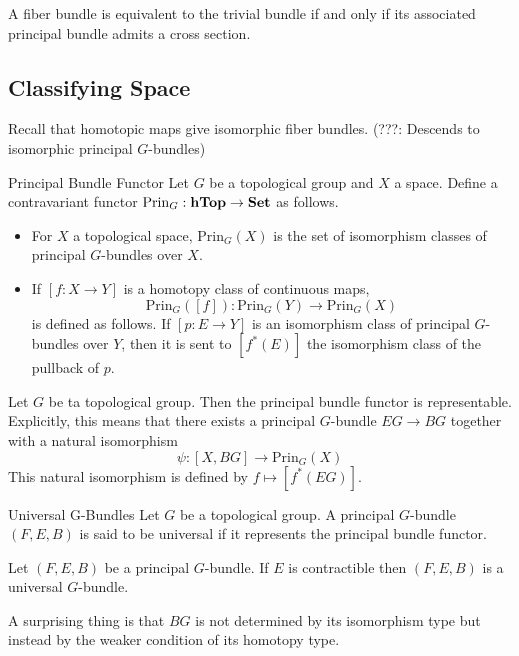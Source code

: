 \documentclass[a4paper]{article}
\begin{document}
\begin{crl}{}{} A fiber bundle is equivalent to the trivial bundle if and only if its associated principal bundle admits a cross section. 
\end{crl}

\subsection{Classifying Space}
Recall that homotopic maps give isomorphic fiber bundles. (???: Descends to isomorphic principal $G$-bundles)

\begin{defn}{Principal Bundle Functor}{} Let $G$ be a topological group and $X$ a space. Define a contravariant functor $\text{Prin}_G:\bold{hTop}\to\bold{Set}$ as follows. 
\begin{itemize}
\item For $X$ a topological space, $\text{Prin}_G(X)$ is the set of isomorphism classes of principal $G$-bundles over $X$. 
\item If $[f:X\to Y]$ is a homotopy class of continuous maps, $$\text{Prin}_G([f]):\text{Prin}_G(Y)\to\text{Prin}_G(X)$$ is defined as follows. If $[p:E\to Y]$ is an isomorphism class of principal $G$-bundles over $Y$, then it is sent to $[f^\ast(E)]$ the isomorphism class of the pullback of $p$. 
\end{itemize}
\end{defn}

\begin{thm}{}{} Let $G$ be ta topological group. Then the principal bundle functor is representable. Explicitly, this means that there exists a principal $G$-bundle $EG\to BG$ together with a natural isomorphism $$\psi:[X,BG]\to\text{Prin}_G(X)$$ This natural isomorphism is defined by $f\mapsto[f^\ast(EG)]$. 
\end{thm}

\begin{defn}{Universal G-Bundles}{} Let $G$ be a topological group. A principal $G$-bundle $(F,E,B)$ is said to be universal if it represents the principal bundle functor. 
\end{defn}

\begin{thm}{}{} Let $(F,E,B)$ be a principal $G$-bundle. If $E$ is contractible then $(F,E,B)$ is a universal $G$-bundle. 
\end{thm}

A surprising thing is that $BG$ is not determined by its isomorphism type but instead by the weaker condition of its homotopy type. 
\end{document}

